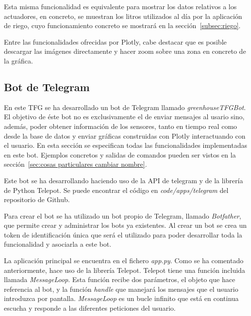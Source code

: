 \documentclass[a4paper, 12pt, oneside]{book}
\begin{document}
Esta misma funcionalidad es equivalente para mostrar los datos relativos a los actuadores, en concreto, se muestran los litros utilizados al día por la aplicación de riego, cuyo funcionamiento concreto se mostrará en la sección~\ref{subsec:riego}.


Entre las funcionalidades ofrecidas por Plotly, cabe destacar que es posible descargar las imágenes directamente y hacer zoom sobre una zona en concreto de la gráfica. 
 

\subsection{Bot de Telegram}
\label{bot de telegram}
En este TFG se ha desarrollado un bot de Telegram llamado \textit{greenhouseTFGBot}. El objetivo de éste bot no es exclusivamente el de enviar mensajes al usario sino, además, poder obtener información de los sensores, tanto en tiempo real como desde la base de datos y enviar gráficas construidas con Plotly interactuando con el usuario. En esta sección se especifican todas las funcionalidades implementadas en este bot. Ejemplos concretos y salidas de comandos pueden ser vistos en la sección~\ref{sec:cosas particulares cambiar nombre}.

Este bot se ha desarrollando haciendo uso de la API de telegram y de la librería de Python Telepot. Se puede encontrar el código en \textit{code/apps/telegram} del repositorio de Github.

Para crear el bot se ha utilizado un bot propio de Telegram, llamado \textit{Botfather}, que permite crear y administrar los bots ya existentes. Al crear un bot se crea un token de identificación única que será el utilizado para poder desarrollar toda la funcionalidad y asociarla a este bot.
 
La aplicación principal se encuentra en el fichero \textit{app.py}. Como se ha comentado anteriormente, hace uso de la librería Telepot. Telepot tiene una función incluida llamada \textit{MessageLoop}. Esta función recibe dos parámetros, el objeto que hace referencia al bot, y la función \textit{handle} que manejará los mensajes que el usuario introduzca por pantalla. \textit{MessageLoop} es un bucle infinito que está en continua escucha y responde a las diferentes peticiones del usuario.
\end{document}

